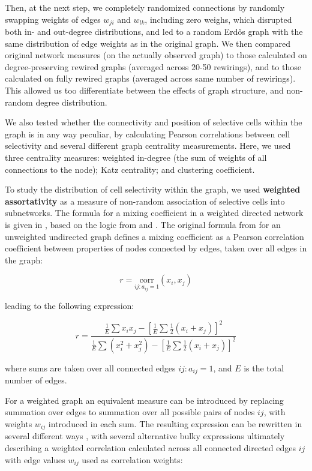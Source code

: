 \documentclass{article}
\begin{document}
Then, at the next step, we completely randomized connections by randomly swapping weights of edges $w_{ji}$ and $w_{lk}$, including zero weighs, which disrupted both in- and out-degree distributions, and led to a random Erd\H{o}s graph with the same distribution of edge weights as in the original graph. We then compared original network measures (on the actually observed graph) to those calculated on degree-preserving rewired graphs (averaged across 20-50 rewirings), and to those calculated on fully rewired graphs (averaged across same number of rewirings). This allowed us too differentiate between the effects of graph structure, and non-random degree distribution.

We also tested whether the connectivity and position of selective cells within the graph is in any way peculiar, by calculating Pearson correlations between cell selectivity and several different graph centrality measurements. Here, we used three centrality measures: weighted in-degree (the sum of weights of all connections to the node); Katz centrality; and clustering coefficient.

To study the distribution of cell selectivity within the graph, we used \textbf{weighted assortativity} as a measure of non-random association of selective cells into subnetworks. The formula for a mixing coefficient in a weighted directed network is given in \citep{farine2014weighted}, based on the logic from \citep{newman2003mixing} and \citep{leung2007weighted}. The original formula from \citep{newman2003mixing} for an unweighted undirected graph defines a mixing coefficient as a Pearson correlation coefficient between properties of nodes connected by edges, taken over all edges in the graph:

\[ r=\underset{ij: a_{ij}=1}{\text{corr}}(x_i,x_j) \]

leading to the following expression:

\[ r = \frac{\frac{1}{E} \sum{x_i x_j} - [\frac{1}{E} \sum{\frac{1}{2}(x_i+x_j)}]^2} {\frac{1}{E} \sum{(x_i^2+x_j^2)}-[\frac{1}{E} \sum{\frac{1}{2}(x_i+x_j)}]^2} \]

where sums are taken over all connected edges $ij: a_{ij}=1$, and $E$ is the total number of edges.

For a weighted graph an equivalent measure can be introduced by replacing summation over edges to summation over all possible pairs of nodes $ij$, with weights $w_{ij}$ introduced in each sum. The resulting expression can be rewritten in several different ways \citep{newman2003mixing,leung2007weighted,farine2014weighted,teller2014assortative}, with several alternative bulky expressions ultimately describing a weighted correlation calculated across all connected directed edges $ij$ with edge values $w_{ij}$ used as correlation weights:
\end{document}
